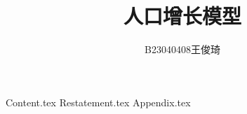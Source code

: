 \documentclass{article}     %
\title{人口增长模型}
\author{B23040408王俊琦}
\begin{document}
{Content.tex}
{Restatement.tex}
{Appendix.tex}
\end{document}
